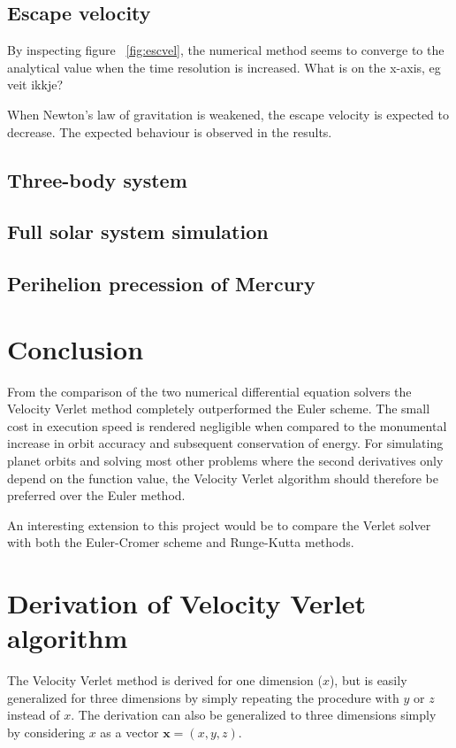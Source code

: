 \documentclass[aps,reprint]{revtex4-1}
\newcommand\blankpage{%
  \null
  \thispagestyle{empty}%
  \addtocounter{page}{-1}%
  \newpage}
\begin{document}
\subsection{Escape velocity}
By inspecting figure ~\ref{fig:escvel}, the numerical method seems to converge
to the analytical value when the time resolution is increased. What is on the x-axis, eg veit ikkje?%

When Newton's law of gravitation is weakened, the escape velocity is expected
to decrease. The expected behaviour is observed in the results.
\subsection{Three-body system}

\subsection{Full solar system simulation}


\subsection{Perihelion precession of Mercury}

\section{Conclusion}
\label{sec:conclusion}
From the comparison of the two numerical differential equation solvers the
Velocity Verlet method completely outperformed the Euler scheme. The small
cost in execution speed is rendered negligible when compared to the monumental
increase in orbit accuracy and subsequent conservation of energy. For simulating planet
orbits and solving most other problems where the second derivatives only depend
on the function value, the Velocity Verlet algorithm should therefore be
preferred over the Euler method.

An interesting extension to this project would be to compare the Verlet solver
with both the Euler-Cromer scheme and Runge-Kutta methods.

\blankpage
\appendix
\section{Derivation of Velocity Verlet algorithm}
\label{sec:velocityverlet}
The Velocity Verlet method is derived for one dimension ($x$), but is easily
generalized for three dimensions by simply repeating the procedure with $y$
or $z$ instead of $x$. The derivation can also be generalized to three dimensions
simply by considering $x$ as a vector $\mathbf{x} = (x, y, z)$.
\end{document}
